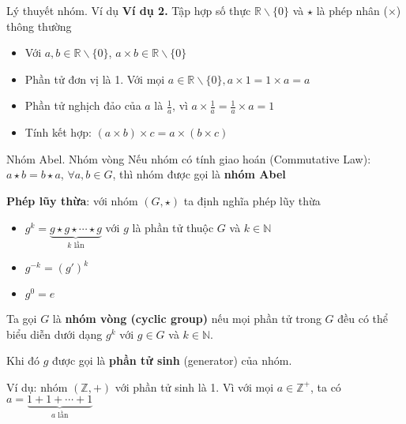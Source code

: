 \documentclass{beamer}
\begin{document}
\begin{frame}{Lý thuyết nhóm. Ví dụ}
    \textbf{Ví dụ 2.} Tập hợp số thực $\mathbb{R}\backslash \{0\}$ và $\star$ là phép nhân ($\times$) thông thường
    \pause
    \begin{itemize}
        \item Với $a, b \in \mathbb{R} \backslash \{0\}$, $a \times b \in \mathbb{R} \backslash \{0\}$
        \item Phần tử đơn vị là 1. Với mọi $a \in \mathbb{R} \backslash \{0\}, a \times 1 = 1 \times a = a$
        \item Phần tử nghịch đảo của $a$ là $\frac{1}{a}$, vì $a \times \frac{1}{a} = \frac{1}{a} \times a = 1$
        \item Tính kết hợp: $(a \times b) \times c = a \times (b \times c)$
    \end{itemize}
\end{frame}

\begin{frame}{Nhóm Abel. Nhóm vòng}
    Nếu nhóm có tính giao hoán (Commutative Law): $a \star b = b \star a$, $\forall a, b \in G$, thì nhóm được gọi là \textbf{nhóm Abel}
    \pause
    
    \textbf{Phép lũy thừa}: với nhóm $(G, \star)$ ta định nghĩa phép lũy thừa
    \begin{itemize}
        \item $g^k = \underbrace{g \star g \star \cdots \star g}_{k \text{ lần}}$ với $g$ là phần tử thuộc $G$ và $k \in \mathbb{N}$
        \item $g^{-k} = (g')^k$
        \item $g^0 = e$
    \end{itemize}
    \pause
    
     Ta gọi $G$ là \textbf{nhóm vòng (cyclic group)} nếu mọi phần tử trong $G$ đều có thể biểu diễn dưới dạng $g^k$ với $g \in G$ và  $k \in \mathbb{N}$.
     
     Khi đó $g$ được gọi là \textbf{phần tử sinh} (generator) của nhóm.
    \pause
    
    Ví dụ: nhóm $(\mathbb{Z}, +)$ với phần tử sinh là 1. Vì với mọi $a \in \mathbb{Z}^+$, ta có $a = \underbrace{1+1+\cdots+1}_{a \text{ lần}}$
\end{frame}
\end{document}
